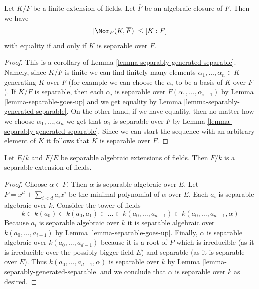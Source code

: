 \begin{lemma}
\label{lemma-separable-equality}
Let $K/F$ be a finite extension of fields. Let $\overline{F}$ be an
algebraic closure of $F$. Then we have
$$
|\Mor_F(K, \overline{F})| \leq [K : F]
$$
with equality if and only if $K$ is separable over $F$.
\end{lemma}

\begin{proof}
This is a corollary of Lemma \ref{lemma-separably-generated-separable}.
Namely, since $K/F$ is finite we can find finitely many elements
$\alpha_1, \ldots, \alpha_n \in K$ generating $K$ over $F$ (for example
we can choose the $\alpha_i$ to be a basis of $K$ over $F$).
If $K/F$ is separable, then each $\alpha_i$ is separable over
$F(\alpha_1, \ldots, \alpha_{i - 1})$ by Lemma \ref{lemma-separable-goes-up}
and we get equality by Lemma \ref{lemma-separably-generated-separable}.
On the other hand, if we have equality, then no matter how we choose
$\alpha_1, \ldots, \alpha_n$ we get that $\alpha_1$ is separable over
$F$ by Lemma \ref{lemma-separably-generated-separable}. Since we
can start the sequence with an arbitrary element of $K$ it follows
that $K$ is separable over $F$.
\end{proof}

\begin{lemma}
\label{lemma-separable-permanence}
Let $E/k$ and $F/E$ be separable algebraic extensions of fields. Then $F/k$
is a separable extension of fields.
\end{lemma}

\begin{proof}
Choose $\alpha \in F$. Then $\alpha$ is separable algebraic over $E$.
Let $P = x^d + \sum_{i < d} a_i x^i$ be the minimal polynomial of
$\alpha$ over $E$. Each $a_i$ is separable algebraic over $k$.
Consider the tower of fields
$$
k \subset k(a_0) \subset k(a_0, a_1) \subset \ldots \subset
k(a_0, \ldots, a_{d - 1}) \subset k(a_0, \ldots, a_{d - 1}, \alpha)
$$
Because $a_i$ is separable algebraic over $k$ it is separable algebraic
over $k(a_0, \ldots, a_{i - 1})$ by Lemma \ref{lemma-separable-goes-up}.
Finally, $\alpha$ is separable algebraic over $k(a_0, \ldots, a_{d - 1})$
because it is a root of $P$ which is irreducible
(as it is irreducible over the possibly bigger field $E$)
and separable (as it is separable over $E$).
Thus $k(a_0, \ldots, a_{d - 1}, \alpha)$ is separable over $k$
by Lemma \ref{lemma-separably-generated-separable}
and we conclude that $\alpha$ is separable over $k$ as desired.
\end{proof}

